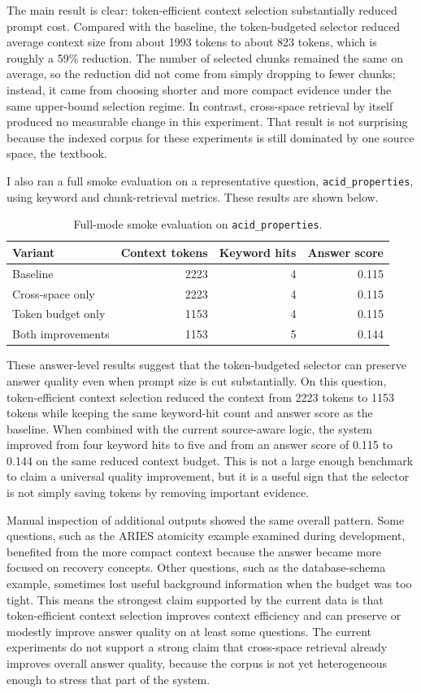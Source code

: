 \documentclass[10pt,twocolumn]{article}
\begin{document}
The main result is clear: token-efficient context selection substantially reduced prompt cost. Compared with the baseline, the token-budgeted selector reduced average context size from about 1993 tokens to about 823 tokens, which is roughly a 59\% reduction. The number of selected chunks remained the same on average, so the reduction did not come from simply dropping to fewer chunks; instead, it came from choosing shorter and more compact evidence under the same upper-bound selection regime. In contrast, cross-space retrieval by itself produced no measurable change in this experiment. That result is not surprising because the indexed corpus for these experiments is still dominated by one source space, the textbook.

I also ran a full smoke evaluation on a representative question, \texttt{acid\_properties}, using keyword and chunk-retrieval metrics. These results are shown below.

\begin{table}[t]
\centering
\small
\begin{tabular}{lrrr}
\toprule
Variant & Context tokens & Keyword hits & Answer score \\
\midrule
Baseline & 2223 & 4 & 0.115 \\
Cross-space only & 2223 & 4 & 0.115 \\
Token budget only & 1153 & 4 & 0.115 \\
Both improvements & 1153 & 5 & 0.144 \\
\bottomrule
\end{tabular}
\caption{Full-mode smoke evaluation on \texttt{acid\_properties}.}
\end{table}

These answer-level results suggest that the token-budgeted selector can preserve answer quality even when prompt size is cut substantially. On this question, token-efficient context selection reduced the context from 2223 tokens to 1153 tokens while keeping the same keyword-hit count and answer score as the baseline. When combined with the current source-aware logic, the system improved from four keyword hits to five and from an answer score of 0.115 to 0.144 on the same reduced context budget. This is not a large enough benchmark to claim a universal quality improvement, but it is a useful sign that the selector is not simply saving tokens by removing important evidence.

Manual inspection of additional outputs showed the same overall pattern. Some questions, such as the ARIES atomicity example examined during development, benefited from the more compact context because the answer became more focused on recovery concepts. Other questions, such as the database-schema example, sometimes lost useful background information when the budget was too tight. This means the strongest claim supported by the current data is that token-efficient context selection improves context efficiency and can preserve or modestly improve answer quality on at least some questions. The current experiments do not support a strong claim that cross-space retrieval already improves overall answer quality, because the corpus is not yet heterogeneous enough to stress that part of the system.
\end{document}
